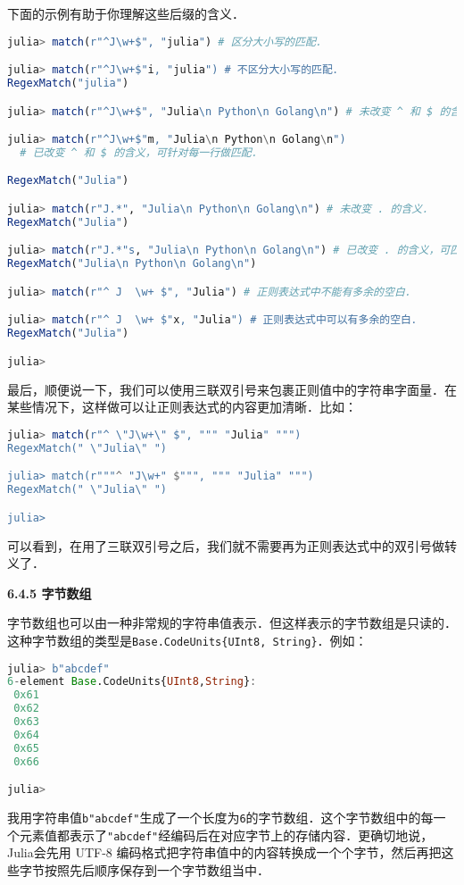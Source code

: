 下面的示例有助于你理解这些后缀的含义．
\begin{lstlisting}[language=julia]
julia> match(r"^J\w+$", "julia") # 区分大小写的匹配．

julia> match(r"^J\w+$"i, "julia") # 不区分大小写的匹配．
RegexMatch("julia")

julia> match(r"^J\w+$", "Julia\n Python\n Golang\n") # 未改变 ^ 和 $ 的含义．

julia> match(r"^J\w+$"m, "Julia\n Python\n Golang\n") 
  # 已改变 ^ 和 $ 的含义，可针对每一行做匹配．

RegexMatch("Julia")

julia> match(r"J.*", "Julia\n Python\n Golang\n") # 未改变 . 的含义．
RegexMatch("Julia")

julia> match(r"J.*"s, "Julia\n Python\n Golang\n") # 已改变 . 的含义，可匹配换行．
RegexMatch("Julia\n Python\n Golang\n")

julia> match(r"^ J  \w+ $", "Julia") # 正则表达式中不能有多余的空白．

julia> match(r"^ J  \w+ $"x, "Julia") # 正则表达式中可以有多余的空白．
RegexMatch("Julia")

julia> 
\end{lstlisting}

最后，顺便说一下，我们可以使用三联双引号来包裹正则值中的字符串字面量．在某些情况下，这样做可以让正则表达式的内容更加清晰．比如：
\begin{lstlisting}[language=julia]
julia> match(r"^ \"J\w+\" $", """ "Julia" """)
RegexMatch(" \"Julia\" ")

julia> match(r"""^ "J\w+" $""", """ "Julia" """)
RegexMatch(" \"Julia\" ")

julia> 
\end{lstlisting}

可以看到，在用了三联双引号之后，我们就不需要再为正则表达式中的双引号做转义了．

\textbf{6.4.5 字节数组}

字节数组也可以由一种非常规的字符串值表示．但这样表示的字节数组是只读的．这种字节数组的类型是\verb|Base.CodeUnits{UInt8, String}|．例如：
\begin{lstlisting}[language=julia]
julia> b"abcdef"
6-element Base.CodeUnits{UInt8,String}:
 0x61
 0x62
 0x63
 0x64
 0x65
 0x66

julia>
\end{lstlisting}

我用字符串值\verb|b"abcdef"|生成了一个长度为\verb|6|的字节数组．这个字节数组中的每一个元素值都表示了\verb|"abcdef"|经编码后在对应字节上的存储内容．更确切地说，Julia会先用 UTF-8 编码格式把字符串值中的内容转换成一个个字节，然后再把这些字节按照先后顺序保存到一个字节数组当中．

